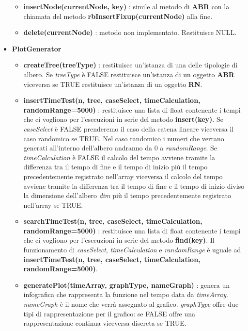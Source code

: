 \begin{itemize}
\begin{itemize}
        \item \textbf{insertNode(currentNode, key)} : simile al metodo di \textbf{ABR} con la chiamata del metodo \textbf{rbInsertFixup(currentNode)} alla fine.
        
        \item \textbf{delete(currentNode)} : metodo non implementato. Restituisce NULL.
        
    \end{itemize}
    
    \item \textbf{PlotGenerator}
    \begin{itemize}
    
        \item \textbf{createTree(treeType)} : restituisce un'istanza di una delle tipologie di albero. Se \textit{treeType} è FALSE restituisce un'istanza di un oggetto \textbf{ABR} viceversa se TRUE restituisce un'istanza di un oggetto \textbf{RN}.
        
        \item \textbf{insertTimeTest(n, tree, caseSelect, timeCalculation, randomRange=5000)} : restituisce una lista di float contenente i tempi che ci vogliono per l'esecuzioni in serie del metodo \textbf{insert(key)}. Se \textit{caseSelect} è FALSE prenderemo il caso della catena lineare viceversa il caso randomico se TRUE. Nel caso randomico i numeri che verrano generati all'interno dell'albero andranno da 0 a \textit{randomRange}. Se \textit{timeCalculation} è FALSE il calcolo del tempo avviene tramite la differenza tra il tempo di fine e il tempo di inizio più il tempo precedentemente registrato nell'array viceversa il calcolo del tempo avviene tramite la differenza tra il tempo di fine e il tempo di inizio diviso la dimensione dell'albero \textit{dim} più il tempo precedentemente registrato nell'array se TRUE.
        
        \item \textbf{searchTimeTest(n, tree, caseSelect, timeCalculation, randomRange=5000)} : restituisce una lista di float contenente i tempi che ci vogliono per l'esecuzioni in serie del metodo \textbf{find(key)}. Il funzionamento di \textit{caseSelect}, \textit{timeCalculation} e \textit{randomRange} è uguale ad \textbf{insertTimeTest(n, tree, caseSelect, timeCalculation, randomRange=5000)}.
        
        \item \textbf{generatePlot(timeArray, graphType, nameGraph)} : genera un infografica che rappresenta la funzione nel tempo data da \textit{timeArray}. \textit{nameGraph} è il nome che verrà assegnato al grafico. \textit{graphType} offre due tipi di rappresentazione per il grafico: se FALSE offre una rappresentazione continua viceversa discreta se TRUE.
        

\end{itemize}
\end{itemize}
